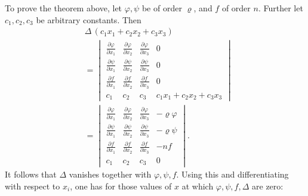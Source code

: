 \documentclass[10pt]{article}
\begin{document}
To prove the theorem above, let \(\varphi,\psi\) be of order \(\varrho\), and \(f\) of order \(n\). Further let \(c_1,c_2,c_3\) be arbitrary constants. Then
\[
\tag{1}
\begin{aligned}
&\Delta\,(c_1x_1+c_2x_2+c_3x_3)\\
&=
\begin{vmatrix}
\frac{\partial\varphi}{\partial x_1}&\frac{\partial\varphi}{\partial x_2}&\frac{\partial\varphi}{\partial x_3}&0\\
\frac{\partial\psi}{\partial x_1}&\frac{\partial\psi}{\partial x_2}&\frac{\partial\psi}{\partial x_3}&0\\
\frac{\partial f}{\partial x_1}&\frac{\partial f}{\partial x_2}&\frac{\partial f}{\partial x_3}&0\\
c_1&c_2&c_3&c_1x_1+c_2x_2+c_3x_3
\end{vmatrix}\\
&=
\begin{vmatrix}
\frac{\partial\varphi}{\partial x_1}&\frac{\partial\varphi}{\partial x_2}&\frac{\partial\varphi}{\partial x_3}&-\varrho\varphi\\
\frac{\partial\psi}{\partial x_1}&\frac{\partial\psi}{\partial x_2}&\frac{\partial\psi}{\partial x_3}&-\varrho\psi\\
\frac{\partial f}{\partial x_1}&\frac{\partial f}{\partial x_2}&\frac{\partial f}{\partial x_3}&-nf\\
c_1&c_2&c_3&0
\end{vmatrix}.
\end{aligned}
\]
It follows that \(\Delta\) vanishes together with \(\varphi,\psi,f\). Using this and differentiating with respect to \(x_i\), one has for those values of \(x\) at which \(\varphi,\psi,f,\Delta\) are zero:
\end{document}
